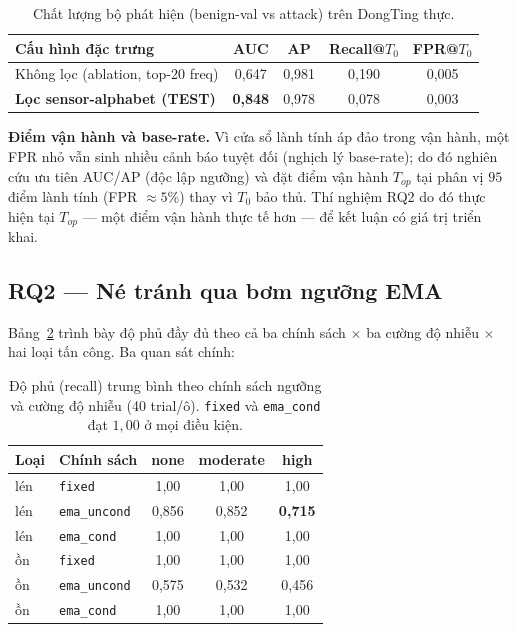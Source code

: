 \documentclass[conference,10pt]{IEEEtran}
\begin{document}
\begin{table}[t]
\caption{Chất lượng bộ phát hiện (benign-val vs attack) trên DongTing thực.}
\label{tab:detector}
\centering
\renewcommand{\arraystretch}{1.15}
\begin{tabular}{@{}lcccc@{}}
\toprule
\textbf{Cấu hình đặc trưng} & \textbf{AUC} & \textbf{AP} & \textbf{Recall@$T_0$} & \textbf{FPR@$T_0$} \\
\midrule
Không lọc (ablation, top-20 freq) & 0{,}647 & 0{,}981 & 0{,}190 & 0{,}005 \\
\textbf{Lọc sensor-alphabet (TEST)} & \textbf{0{,}848} & 0{,}978 & 0{,}078 & 0{,}003 \\
\bottomrule
\end{tabular}
\end{table}

\textbf{Điểm vận hành và base-rate.} Vì cửa sổ lành tính áp đảo trong vận hành, một FPR nhỏ vẫn sinh nhiều cảnh báo tuyệt đối (nghịch lý base-rate); do đó nghiên cứu ưu tiên AUC/AP (độc lập ngưỡng) và đặt điểm vận hành $T_{op}$ tại phân vị $95$ điểm lành tính (FPR $\approx 5\%$) thay vì $T_0$ bảo thủ. Thí nghiệm RQ2 do đó thực hiện tại $T_{op}$ — một điểm vận hành thực tế hơn — để kết luận có giá trị triển khai.

\subsection{RQ2 — Né tránh qua bơm ngưỡng EMA}
Bảng~\ref{tab:full} trình bày độ phủ đầy đủ theo cả ba chính sách $\times$ ba cường độ nhiễu $\times$ hai loại tấn công. Ba quan sát chính:

\begin{table}[t]
\caption{Độ phủ (recall) trung bình theo chính sách ngưỡng và cường độ nhiễu (40 trial/ô). \texttt{fixed} và \texttt{ema\_cond} đạt $1{,}00$ ở mọi điều kiện.}
\label{tab:full}
\centering
\renewcommand{\arraystretch}{1.15}
\begin{tabular}{@{}llccc@{}}
\toprule
\textbf{Loại} & \textbf{Chính sách} & \textbf{none} & \textbf{moderate} & \textbf{high} \\
\midrule
lén & \texttt{fixed}      & 1{,}00 & 1{,}00 & 1{,}00 \\
lén & \texttt{ema\_uncond}& 0{,}856 & 0{,}852 & \textbf{0{,}715} \\
lén & \texttt{ema\_cond}  & 1{,}00 & 1{,}00 & 1{,}00 \\
\midrule
ồn  & \texttt{fixed}      & 1{,}00 & 1{,}00 & 1{,}00 \\
ồn  & \texttt{ema\_uncond}& 0{,}575 & 0{,}532 & 0{,}456 \\
ồn  & \texttt{ema\_cond}  & 1{,}00 & 1{,}00 & 1{,}00 \\
\bottomrule
\end{tabular}
\end{table}
\end{document}
